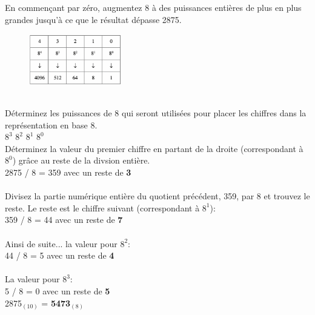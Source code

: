 \begin{Exercice}[20 minutes]
    En commençant par zéro, augmentez 8 à des puissances entières de plus en plus grandes jusqu'à ce que le résultat dépasse 2875.\\
    \begin{figure}[h]
        \includegraphics[width=0.36\textwidth]{img/6.3.2.png}
    \end{figure}\\
    Déterminez les puissances de 8 qui seront utilisées pour placer les chiffres dans la représentation en base 8.\\

    $8^3$   $8^2$   $8^1$   $8^0$ \\

    Déterminez la valeur du premier chiffre en partant de la droite (correspondant à $8^0$) grâce au reste de la divsion entière.\\
    2875 / 8 = 359 avec un reste de \textbf{3}\\\\
    Divisez la partie numérique entière du quotient précédent, 359, par 8 et trouvez le reste. Le reste est le chiffre suivant (correspondant à $8^1$):\\
    359 / 8 = 44 avec un reste de \textbf{7}\\\\
    Ainsi de suite... la valeur pour $8^2$:\\
    44 / 8 = 5 avec un reste de \textbf{4}\\\\
    La valeur pour $8^3$:\\
    5 / 8 = 0 avec un reste de \textbf{5}\\

    2875$_{(10)}$ = \textbf{5473$_{(8)}$}

\end{Exercice}

